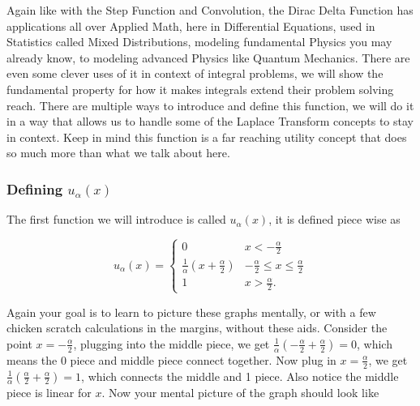 \documentclass[12pt]{article}
\begin{document}
Again like with the Step Function and Convolution, the Dirac Delta Function has applications all over Applied Math, here in Differential Equations, used in Statistics called Mixed Distributions, modeling fundamental Physics you may already know, to modeling advanced Physics like Quantum Mechanics. There are even some clever uses of it in context of integral problems, we will show the fundamental property for how it makes integrals extend their problem solving reach. There are multiple ways to introduce and define this function, we will do it in a way that allows us to handle some of the Laplace Transform concepts to stay in context. Keep in mind this function is a far reaching utility concept that does so much more than what we talk about here. \\

\subsubsection{Defining $u_{\alpha}(x)$}

The first function we will introduce is called $u_{\alpha}(x)$, it is defined piece wise as

\begin{equation*}
    u_{\alpha}(x)=\left\{
        \begin{array}{cc}
            0 &  x < -\frac{\alpha}{2}  \\
            \frac{1}{\alpha}\left(x+\frac{\alpha}{2}\right) &  -\frac{\alpha}{2} \leq x \leq \frac{\alpha}{2} \\
            1 & x > \frac{\alpha}{2}.
        \end{array}
    \right.
\end{equation*}

Again your goal is to learn to picture these graphs mentally, or with a few chicken scratch calculations in the margins, without these aids. Consider the point $x=-\frac{\alpha}{2}$, plugging into the middle piece, we get $\frac{1}{\alpha}\left(-\frac{\alpha}{2}+\frac{\alpha}{2}\right)=0$, which means the 0 piece and middle piece connect together. Now plug in $x=\frac{\alpha}{2}$, we get $\frac{1}{\alpha}\left(\frac{\alpha}{2}+\frac{\alpha}{2}\right)=1$, which connects the middle and 1 piece. Also notice the middle piece is linear for $x$. Now your mental picture of the graph should look like

\pagebreak
\end{document}
